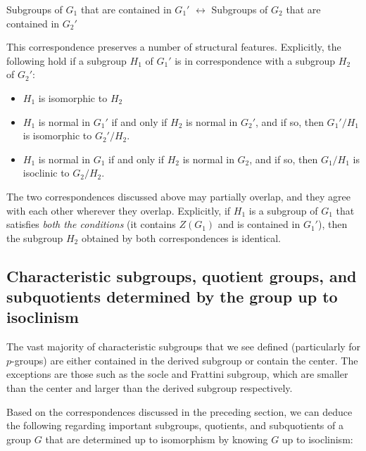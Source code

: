 \begin{center}
  Subgroups of $G_1$ that are contained in $G_1'$ $\leftrightarrow$
  Subgroups of $G_2$ that are contained in $G_2'$
\end{center}

This correspondence preserves a number of structural
features. Explicitly, the following hold if a subgroup $H_1$ of $G_1'$
is in correspondence with a subgroup $H_2$ of $G_2'$:

\begin{itemize}
\item $H_1$ is isomorphic to $H_2$
\item $H_1$ is normal in $G_1'$ if and only if $H_2$ is normal in
  $G_2'$, and if so, then $G_1'/H_1$ is isomorphic to $G_2'/H_2$.
\item $H_1$ is normal in $G_1$ if and only if $H_2$ is normal in
  $G_2$, and if so, then $G_1/H_1$ is isoclinic to $G_2/H_2$.
\end{itemize}

The two correspondences discussed above may partially overlap, and
they agree with each other wherever they overlap. Explicitly, if $H_1$
is a subgroup of $G_1$ that satisfies {\em both the conditions} (it
contains $Z(G_1)$ and is contained in $G_1'$), then the subgroup $H_2$
obtained by both correspondences is identical.

\subsection{Characteristic subgroups, quotient groups, and subquotients determined by the group up to isoclinism}\label{sec:isoclinism-char-sub-quot}

The vast majority of characteristic subgroups that we see defined
(particularly for $p$-groups) are either contained in the derived
subgroup or contain the center. The exceptions are those such as the
socle and Frattini subgroup, which are smaller than the center and
larger than the derived subgroup respectively.

Based on the correspondences discussed in the preceding section, we
can deduce the following regarding important subgroups, quotients, and
subquotients of a group $G$ that are determined up to isomorphism by
knowing $G$ up to isoclinism:

